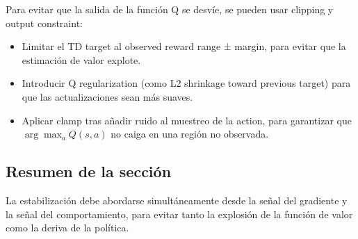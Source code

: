 Para evitar que la salida de la función Q se desvíe, se pueden usar clipping y output constraint:

\begin{itemize}
    \item Limitar el TD target al observed reward range ± margin, para evitar que la estimación de valor explote.
    \item Introducir Q regularization (como L2 shrinkage toward previous target) para que las actualizaciones sean más suaves.
    \item Aplicar clamp tras añadir ruido al muestreo de la action, para garantizar que $\arg\max_a Q(s,a)$ no caiga en una región no observada.
\end{itemize}

\subsection{Resumen de la sección}

La estabilización debe abordarse simultáneamente desde la señal del gradiente y la señal del comportamiento, para evitar tanto la explosión de la función de valor como la deriva de la política.

